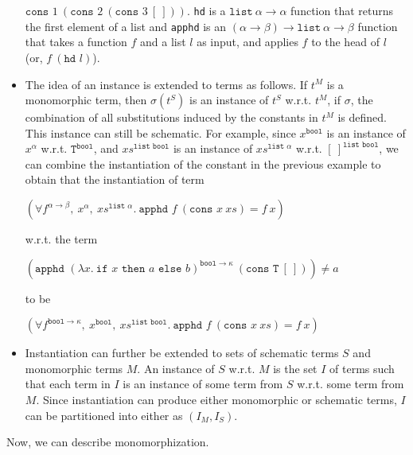 \documentclass{article}
\begin{document}
\begin{itemize}
			$\texttt{cons }1\ (\texttt{cons }2
			\ (\texttt{cons }3\ [\ ]))$.
			\texttt{hd} is a $\texttt{list}\ 
			\alpha \to \alpha$ function that 
			returns the first element of a list 
			and \texttt{apphd} is an $(\alpha
			\to \beta) \to \texttt{list}\
			\alpha \to \beta$ function that
			takes a function $f$ and a list 
			$l$ as input, and applies $f$
			to the head of $l$ (or, $f\ 
			(\texttt{hd }l)$).
		\item The idea of an instance is 
			extended to terms as follows. If 
			$t^M$ is a monomorphic term, then 
			$\sigma(t^S)$ is an instance of 
			$t^S$ w.r.t. $t^M$, if 
			$\sigma$, the combination of all 
			substitutions induced by the 
			constants in $t^M$ is defined. This 
			instance can still be schematic. For 
			example, since $x^{\texttt{bool}}$ is 
			an instance of $x^{\alpha}$ w.r.t.
			$\texttt{T}^{\texttt{bool}}$, 
			and $xs^{\texttt{list bool}}$ is 
			an instance of 
			$xs^{\texttt{list }\alpha}$ 
			w.r.t. $[\ ]^{\texttt{list bool}}$,
			we can combine the instantiation 
			of the constant in the previous 
			example to obtain that the 
			instantiation of term
			\begin{center}
				$(\forall f^{\alpha \to \beta},\ 
				x^{\alpha},\ xs^{\texttt{list }
				\alpha}.\ \texttt{apphd }f\ 
				(\texttt{cons }x\ xs) = f\ x)$
			\end{center}
			w.r.t. the term
			\begin{center}
				$(\texttt{apphd }(\lambda 
				x.\ \texttt{if }x\texttt{ then }
				a \texttt{ else } b)^{\texttt{bool} 
				\to \kappa}\ (\texttt{cons T}\ 
				[\ ])) \neq a$
			\end{center}
			to be
			\begin{center}
				$(\forall f^{\texttt{bool}
				\to \kappa},\ x^{\texttt{bool}},
				\ xs^{\texttt{list bool}}.\ 
				\texttt{apphd }f\ (\texttt{cons }x
				\ xs) = f\ x)$
			\end{center}
		\item Instantiation can further be 
			extended to sets of schematic 
			terms $S$ and monomorphic terms $M$. 
			An instance of $S$ w.r.t. 
			$M$ is the set $I$ of terms such 
			that each term in $I$ is an instance 
			of some term from $S$ w.r.t. 
			some term from $M$. Since 
			instantiation can produce either 
			monomorphic or schematic terms, $I$
			can be partitioned into either as
			$(I_M, I_S)$.
		\end{itemize}
		Now, we can describe monomorphization.
\end{document}
